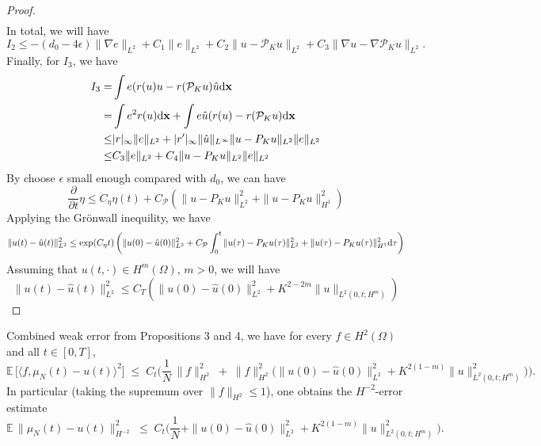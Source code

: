 \documentclass[preprint,12pt]{elsarticle}
\theoremstyle{definition}
\theoremstyle{remark}
\begin{document}
\begin{proof}
\[\begin{aligned}
\end{aligned}
\]
In total, we will have
\[
I_2 \leq -(d_0-4\epsilon)\|\nabla e \|_{L^2}  + C_1 \|e\|_{L^2} + C_2 \| u - \mathcal P_K u  \|_{L^2}  + C_3 \| \nabla u - \nabla \mathcal P_K u  \|_{L^2}.
\]
Finally, for $I_3$, we have
\[
\begin{aligned}
I_3 =& \int e (r(u)u - r(\mathcal P_K u )\hat u \mathrm{d} \mathbf{x}\\
    =&  \int e^2 r(u) \mathrm{d} \mathbf{x} 
    + \int  e \hat{u} (r(u)- r(\mathcal P_K u )\mathrm{d} \mathbf{x} 
    \\
    \leq & |r|_\infty \|e\|_{L^2} + |r'|_\infty \|\hat u \|_{L^\infty}\|u - P_K u \|_{L^2}\|e\|_{L^2}\\
   \leq & C_3 \|e\|_{L^2}+C_4 \|u - P_K u \|_{L^2}\|e\|_{L^2} \\
\end{aligned}
\]
By choose $\epsilon$ small enough compared with $d_0$, we can have
\[
\frac{\partial }{\partial t }\eta \leq C_\eta \eta(t) + C_{\mathcal P } \left(\|u - P_K u \|^2_{L^2} + \|u - P_K u \|^2_{H^1} \right)
\]
Applying the Gr\"onwall inequility, we have 
\[
\|u(t) - \hat u (t)\|^2_{L^2} \leq \exp( C_\eta t )\left(\|u(0) - \hat u (0)\|^2_{L^2} +  C_{\mathcal P }\int _0^t \|u(\tau) - P_K u(\tau) \|^2_{L^2} + \|u(\tau) - P_K u(\tau) \|^2_{H^1} \mathrm{d} \tau \right)
\]
Assuming that $u(t,\cdot)\in H^m(\Omega)$, $m>0$, we will have 
\[
\|u(t) - \hat u (t)\|^2_{L^2} \leq C_T\left(\|u(0) - \hat u (0)\|^2_{L^2} +  K^{2-2m}\|u\|_{L^2(0,t;H^m)} \right)
\]
\end{proof}


Combined weak error from Propositions 3 and 4, we have for every $f\in H^2(\Omega)$ and all $t\in[0,T]$,
\[
\mathbb{E}\,\big[\langle f,\mu_N(t)-u(t)\rangle^2\big]
\;\le\;
C_t\Big(
\frac{1}{N}\,\|f\|_{H^2}^2
\;+\;
\|f\|_{H^2}^2\big(\|u(0)-\hat u(0)\|_{L^2}^2
+ K^{2(1-m)}\|u\|_{L^2(0,t;H^m)}^2\big)
\Big).
\]
In particular (taking the supremum over $\|f\|_{H^2}\le1$), one obtains the $H^{-2}$-error estimate
\[
\mathbb{E}\,\|\mu_N(t)-u(t)\|_{H^{-2}}^2
\;\le\;
C_t\Big(
\frac{1}{N}
+ \|u(0)-\hat u(0)\|_{L^2}^2
+ K^{2(1-m)}\|u\|_{L^2(0,t;H^m)}^2
\Big).
\]
\end{document}
